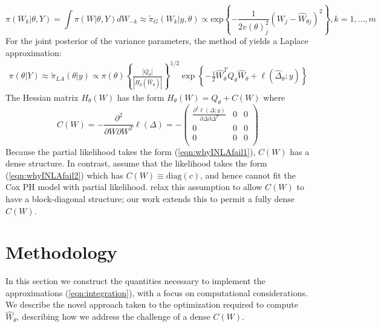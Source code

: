 \documentclass[]{article}
\begin{document}
\begin{equation}\label{eqb:marginalgaussianapprox}
\pi(W_{k}|\theta,Y) = \int\pi(W|\theta,Y)dW_{-k} \approx \tilde{\pi}_{G}(W_{k}|y,\theta) \propto\text{exp}\left\{-\frac{1}{2v(\theta)_j^2} \left(W_j-\widehat{W}_{\theta j} \right)^2 \right\}, k = 1,\ldots,m
\end{equation}
For the joint posterior of the variance parameters, the method of \citet{tierney} yields a Laplace approximation:
\begin{equation}\begin{aligned}\label{eqn:laplace}
\pi(\theta|Y) \approx \tilde{\pi}_{LA}(\theta|y) \propto \pi(\theta)\left\{\frac{\left|Q_{\theta}\right|}{\left|H_{\theta}\left(\widehat{W}_{\theta}\right)\right|}\right\}^{1/2}\exp\left\{ -\frac{1}{2}\widehat{W}_{\theta}^{T}Q_{\theta}\widehat{W}_{\theta} + \ell\left(\widehat{\Delta}_{\theta};y \right)\right\}
\end{aligned}\end{equation}
The Hessian matrix $H_{\theta}(W)$ has the form $H_{\theta}(W) = Q_{\theta} + C(W)$ where
\begin{equation*}
C(W) = -\frac{\partial^{2}}{\partial W\partial W^{T}}\ell(\Delta) = -\begin{pmatrix}
\frac{\partial^{2}\ell(\Delta;y)}{\partial\Delta\partial\Delta^{T}} & 0 & 0 \\
0 & 0 & 0 \\
0 & 0 & 0 \\
\end{pmatrix}
\end{equation*}
Because the partial likelihood takes the form (\ref{eqn:whyINLAfail1}), $C(W)$ has a dense structure. In contrast, \citet{inla} assume that the likelihood takes the form (\ref{eqn:whyINLAfail2}) which has $C(W) \equiv \text{diag}(c)$, and hence cannot fit the Cox PH model with partial likelihood. \citet{casecross} relax this assumption to allow $C(W)$ to have a block-diagonal structure; our work extends this to permit a fully dense $C(W)$. 

\section{Methodology}\label{sec:method}

In this section we construct the quantities necessary to implement the approximations (\ref{eqn:integration}), with a focus on computational considerations. We describe the novel approach taken to the optimization required to compute $\widehat{W}_{\theta}$, describing how we address the challenge of a dense $C(W)$.
\end{document}
